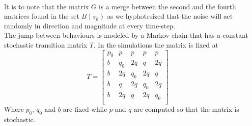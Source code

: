 \documentclass[twocolumn]{article}
\begin{document}
\\
It is to note that the matrix $G$ is a merge between the second and the fourth matrices found in the set $B(s_{k})$ as we hyphotesized that
the noise will act randomly in direction and magnitude at every time-step.
\\
The jump between behaviours is modeled by a Markov chain that has a constant stochastic transition matrix $T$.
In the simulations the matrix is fixed at
\begin{equation*}
    T=\begin{bmatrix}
        p_{0} & p     & p     & p     & p     \\
        b     & q_{0} & 2q    & q     & 2q    \\
        b     & 2q    & q_{0} & 2q    & q     \\
        b     & q     & 2q    & q_{0} & 2q    \\
        b     & 2q    & q     & 2q    & q_{0} \\
    \end{bmatrix}
\end{equation*}
Where $p_{0}$, $q_{0}$ and $b$ are fixed while $p$ and $q$ are computed so that the matrix is stochastic.
\end{document}
